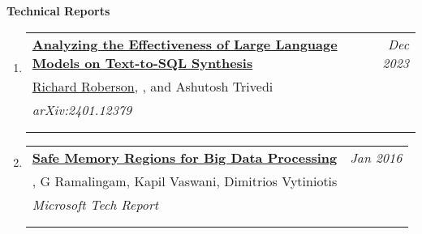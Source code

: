 \documentclass{article}
\makeatletter
\newenvironment{benumerate}[2]{
    \let\oldItem\item
    \def\item{\addtocounter{enumi}{-2}\oldItem}
    \begin{enumerate}[#2] \itemsep3pt
    \setcounter{enumi}{#1}
    \addtocounter{enumi}{1}}
  {\end{enumerate}}
\newenvironment{region}[3]{%
  {{\textbf{#1}}}
  \begin{benumerate}{#3}{\color{RoyalBlue}#2}}
  {\end{benumerate}\vspace{0.8ex}}
\newenvironment{publication}[6]
{ \item
  \begin{tabular*}{6.8in}{p{6in}@{\extracolsep{\fill}}r}
    \href{#1}{\textbf{#2}} & \textit{#3}\\ #4 &\\ \textit{#5}&\\
    \ifthenelse{\equal{#6}{}}{}{#6&\\}
  \end{tabular*}
} {}
\makeatother
\begin{document}
\begin{region} {Technical Reports}{{T}1}{2}
 
   \begin{publication} {https://arxiv.org/abs/2401.12379}
    {Analyzing the Effectiveness of Large Language Models on
    Text-to-SQL Synthesis}
    {Dec 2023} {\underline{Richard Roberson}, \ugkaki, and Ashutosh Trivedi}
    {arXiv:2401.12379} {}
  \end{publication}

  \begin{publication}{https://www.microsoft.com/en-us/research/publication/safe-memory-regions-big-data-processing}
    {Safe Memory Regions for Big Data Processing}
    {Jan 2016}{\ugkaki, G Ramalingam, Kapil Vaswani, Dimitrios
    Vytiniotis} {Microsoft Tech Report} {}
  \end{publication}
\end{region}


\end{document}
